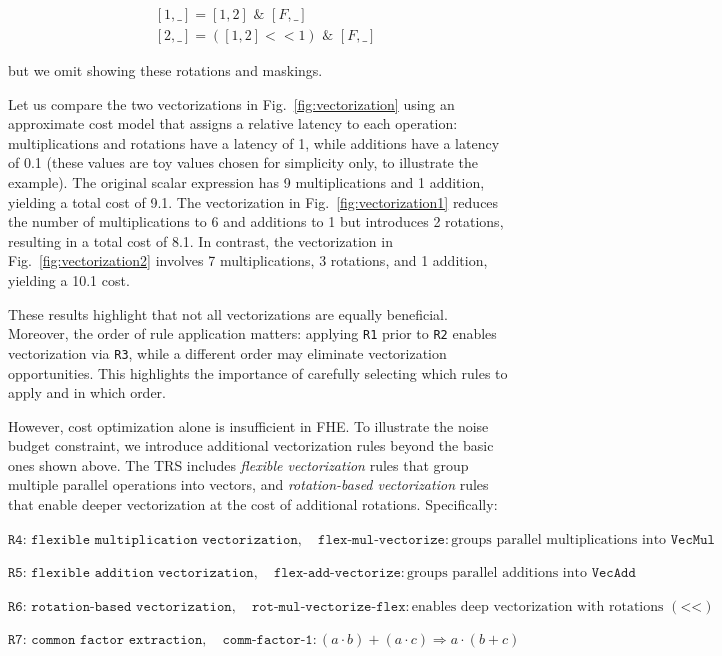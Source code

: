 {
\shrink[1]
\CodeSize
\[
\begin{aligned}
& [1,\_] = [1,2] \,\,\&\,\, [F,\_] \\
& [2,\_] = ([1,2]<<1) \,\,\&\,\, [F,\_]
\end{aligned}
\]
\shrink[1]
}

\noindent but we omit showing these rotations and maskings.

Let us compare the two vectorizations in Fig.~\ref{fig:vectorization} using an approximate cost model that assigns a relative latency to each operation: multiplications and rotations have a latency of 1, while additions have a latency of 0.1 (these values are toy values chosen for simplicity only, to illustrate the example). The original scalar expression has 9 multiplications and 1 addition, yielding a total cost of 9.1.
The vectorization in Fig.~\ref{fig:vectorization1} reduces the number of multiplications to 6 and additions to 1 but introduces 2 rotations, resulting in a total cost of 8.1. In contrast, the vectorization in Fig.~\ref{fig:vectorization2} involves 7 multiplications, 3 rotations, and 1 addition, yielding a 10.1 cost.

These results highlight that not all vectorizations are equally beneficial. Moreover, the order of rule application matters: applying \texttt{R1} prior to \texttt{R2} enables vectorization via \texttt{R3}, while a different order may eliminate vectorization opportunities. This highlights the importance of carefully selecting which rules to apply and in which order.

However, cost optimization alone is insufficient in FHE. To illustrate the noise budget constraint, we introduce additional vectorization rules beyond the basic ones shown above. The TRS includes \textit{flexible vectorization} rules that group multiple parallel operations into vectors, and \textit{rotation-based vectorization} rules that enable deeper vectorization at the cost of additional rotations. Specifically:

{
\vspace{0.25cm}
\CodeSize
\(
\texttt{R4: flexible multiplication vectorization},\quad \texttt{flex-mul-vectorize}: \text{groups parallel multiplications into } \texttt{VecMul}
\)

\(
\texttt{R5: flexible addition vectorization},\quad \texttt{flex-add-vectorize}: \text{groups parallel additions into } \texttt{VecAdd}
\)

\(
\texttt{R6: rotation-based vectorization},\quad \texttt{rot-mul-vectorize-flex}: \text{enables deep vectorization with rotations } (\texttt{<<})
\)

\(
\texttt{R7: common factor extraction},\quad \texttt{comm-factor-1}: (a \cdot b) + (a \cdot c) \Rightarrow a \cdot (b + c)
\)
\vspace{0.25cm}
}

